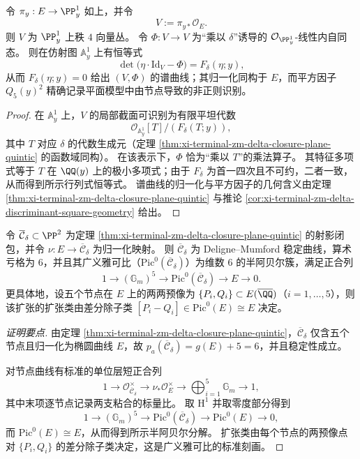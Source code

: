 \begin{proposition}\label{prop:xi-terminal-zm-leyang-delta-multiplication-spectral-structure}
令 \(\pi_y:E\to\PP^1_y\) 如上，并令
\[
V:=\pi_{y*}\mathcal O_E.
\]
则 \(V\) 为 \(\PP^1_y\) 上秩 \(4\) 向量丛。
令 \(\Phi:V\to V\) 为“乘以 \(\delta\)”诱导的 \(\mathcal O_{\PP^1_y}\)-线性内自同态。
则在仿射图 \(\mathbb A^1_y\) 上有恒等式
\[
\det\bigl(\eta\cdot\mathrm{Id}_{V}-\Phi\bigr)=F_\delta(\eta;y),
\]
从而 \(F_\delta(\eta;y)=0\) 给出 \((V,\Phi)\) 的谱曲线；其归一化同构于 \(E\)，而平方因子 \(Q_5(y)^2\) 精确记录平面模型中由节点导致的非正则识别。
\end{proposition}
\begin{proof}
在 \(\mathbb A^1_y\) 上，\(V\) 的局部截面可识别为有限平坦代数
\[
\mathcal O_{\mathbb A^1_y}[T]\big/(F_\delta(T;y)),
\]
其中 \(T\) 对应 \(\delta\) 的代数生成元（定理 \ref{thm:xi-terminal-zm-delta-closure-plane-quintic} 的函数域同构）。
在该表示下，\(\Phi\) 恰为“乘以 \(T\)”的乘法算子。
其特征多项式等于 \(T\) 在 \(\QQ(y)\) 上的极小多项式；由于 \(F_\delta\) 为首一四次且不可约，二者一致，从而得到所示行列式恒等式。
谱曲线的归一化与平方因子的几何含义由定理 \ref{thm:xi-terminal-zm-delta-closure-plane-quintic} 与推论 \ref{cor:xi-terminal-zm-delta-discriminant-square-geometry} 给出。
\end{proof}

\begin{theorem}[五节点平面模型的广义雅可比与半阿贝尔分解]\label{thm:xi-terminal-zm-delta-generalized-jacobian-semiabelian}
令 \(\overline{\mathcal C}_\delta\subset\PP^2\) 为定理 \ref{thm:xi-terminal-zm-delta-closure-plane-quintic} 的射影闭包，并令 \(\nu:E\to\overline{\mathcal C}_\delta\) 为归一化映射。
则 \(\overline{\mathcal C}_\delta\) 为 Deligne--Mumford 稳定曲线，算术亏格为 \(6\)，并且其广义雅可比（\(\mathrm{Pic}^0(\overline{\mathcal C}_\delta)\)）为维数 \(6\) 的半阿贝尔簇，满足正合列
\[
1\longrightarrow (\mathbb G_m)^5\longrightarrow \mathrm{Pic}^0(\overline{\mathcal C}_\delta)\longrightarrow E\longrightarrow 0.
\]
更具体地，设五个节点在 \(E\) 上的两两预像为 \(\{P_i,Q_i\}\subset E(\overline{\QQ})\)（\(i=1,\dots,5\)），则该扩张的扩张类由差分除子类 \([P_i-Q_i]\in \mathrm{Pic}^0(E)\cong E\) 决定。
\end{theorem}
\begin{proof}[证明要点]
由定理 \ref{thm:xi-terminal-zm-delta-closure-plane-quintic}，\(\overline{\mathcal C}_\delta\) 仅含五个节点且归一化为椭圆曲线 \(E\)，故
\(
p_a(\overline{\mathcal C}_\delta)=g(E)+5=6
\)，并且稳定性成立。
\par
对节点曲线有标准的单位层短正合列
\[
1\to \mathcal O_{\overline{\mathcal C}_\delta}^{\times}\to \nu_{*}\mathcal O_{E}^{\times}\to \bigoplus_{i=1}^{5}\mathbb G_m\to 1,
\]
其中末项逐节点记录两支粘合的标量比。
取 \(\mathrm H^{1}\) 并取零度部分得到
\[
1\to(\mathbb G_m)^5\to \mathrm{Pic}^0(\overline{\mathcal C}_\delta)\to \mathrm{Pic}^0(E)\to 0,
\]
而 \(\mathrm{Pic}^0(E)\cong E\)，从而得到所示半阿贝尔分解。
扩张类由每个节点的两预像点对 \(\{P_i,Q_i\}\) 的差分除子类决定，这是广义雅可比的标准刻画。
\end{proof}

